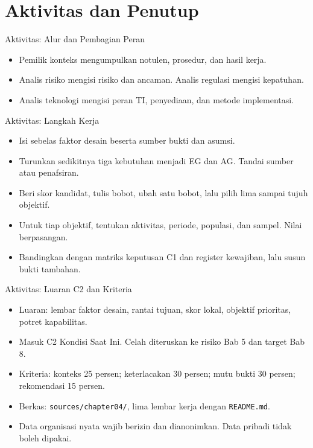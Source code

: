 \documentclass[aspectratio=169, table, 12pt]{beamer}
\begin{document}
\section{Aktivitas dan Penutup}

\begin{frame}{{\Large Aktivitas: Alur dan Pembagian Peran}}
  \centering
  \vspace{2pt}
  

  \vspace{4pt}
  \raggedright\small
  \begin{itemize}
    \item Pemilik konteks mengumpulkan notulen, prosedur, dan hasil kerja.
    \item Analis risiko mengisi risiko dan ancaman. Analis regulasi mengisi kepatuhan.
    \item Analis teknologi mengisi peran TI, penyediaan, dan metode implementasi.
  \end{itemize}
\end{frame}

\begin{frame}{{\Large Aktivitas: Langkah Kerja}}
  \vspace{4pt}
  \small
  \begin{itemize}
    \item Isi sebelas faktor desain beserta sumber bukti dan asumsi.
    \item Turunkan sedikitnya tiga kebutuhan menjadi EG dan AG. Tandai sumber atau penafsiran.
    \item Beri skor kandidat, tulis bobot, ubah satu bobot, lalu pilih lima sampai tujuh objektif.
    \item Untuk tiap objektif, tentukan aktivitas, periode, populasi, dan sampel. Nilai berpasangan.
    \item Bandingkan dengan matriks keputusan C1 dan register kewajiban, lalu susun bukti tambahan.
  \end{itemize}
\end{frame}

\begin{frame}{{\Large Aktivitas: Luaran C2 dan Kriteria}}
  \vspace{4pt}
  \small
  \begin{itemize}
    \item Luaran: lembar faktor desain, rantai tujuan, skor lokal, objektif prioritas, potret kapabilitas.
    \item Masuk C2 Kondisi Saat Ini. Celah diteruskan ke risiko Bab 5 dan target Bab 8.
    \item Kriteria: konteks 25 persen; keterlacakan 30 persen; mutu bukti 30 persen; rekomendasi 15 persen.
    \item Berkas: \texttt{sources/chapter04/}, lima lembar kerja dengan \texttt{README.md}.
    \item Data organisasi nyata wajib berizin dan dianonimkan. Data pribadi tidak boleh dipakai.
  \end{itemize}
\end{frame}
\end{document}
